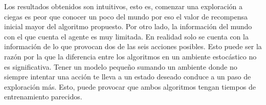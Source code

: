 

Los resultados obtenidos son intuitivos, esto es, comenzar una exploración a ciegas es 
peor que conocer un poco del mundo por eso el valor de recompensa inicial mayor del algoritmo propuesto. 
Por otro lado, la información del mundo con el que cuenta el agente es muy limitada. En realidad solo se cuenta con la información de lo que provocan dos de las seis acciones posibles. Esto puede ser la razón por la que la diferencia entre los algoritmos 
en un ambiente estocástico no es significativa. Tener un modelo pequeño sumando un ambiente donde no siempre intentar una acción te lleva a un estado deseado conduce a un paso de exploración más. Esto, puede provocar que ambos algoritmos tengan tiempos de entrenamiento parecidos.
 
